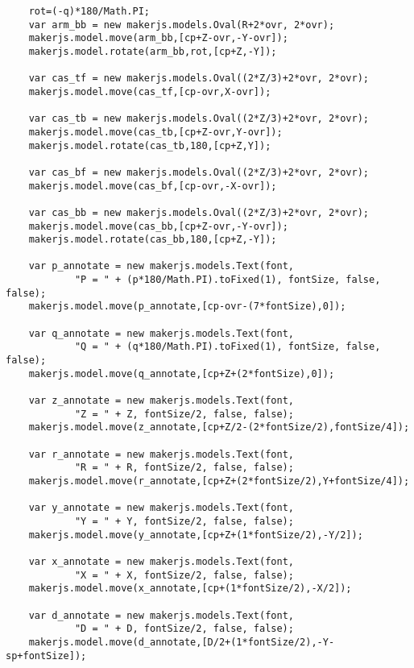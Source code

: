\documentclass[11pt]{article}
\begin{document}
\begin{lstlisting}
    rot=(-q)*180/Math.PI;
    var arm_bb = new makerjs.models.Oval(R+2*ovr, 2*ovr);
    makerjs.model.move(arm_bb,[cp+Z-ovr,-Y-ovr]);
    makerjs.model.rotate(arm_bb,rot,[cp+Z,-Y]);
            
    var cas_tf = new makerjs.models.Oval((2*Z/3)+2*ovr, 2*ovr);
    makerjs.model.move(cas_tf,[cp-ovr,X-ovr]);
                        
    var cas_tb = new makerjs.models.Oval((2*Z/3)+2*ovr, 2*ovr);
    makerjs.model.move(cas_tb,[cp+Z-ovr,Y-ovr]);
    makerjs.model.rotate(cas_tb,180,[cp+Z,Y]);
                            
    var cas_bf = new makerjs.models.Oval((2*Z/3)+2*ovr, 2*ovr);
    makerjs.model.move(cas_bf,[cp-ovr,-X-ovr]);
            
    var cas_bb = new makerjs.models.Oval((2*Z/3)+2*ovr, 2*ovr);
    makerjs.model.move(cas_bb,[cp+Z-ovr,-Y-ovr]);
    makerjs.model.rotate(cas_bb,180,[cp+Z,-Y]);
                                          
    var p_annotate = new makerjs.models.Text(font,
            "P = " + (p*180/Math.PI).toFixed(1), fontSize, false, false);
    makerjs.model.move(p_annotate,[cp-ovr-(7*fontSize),0]);
                      
    var q_annotate = new makerjs.models.Text(font,
            "Q = " + (q*180/Math.PI).toFixed(1), fontSize, false, false);
    makerjs.model.move(q_annotate,[cp+Z+(2*fontSize),0]);
                      
    var z_annotate = new makerjs.models.Text(font,
            "Z = " + Z, fontSize/2, false, false);
    makerjs.model.move(z_annotate,[cp+Z/2-(2*fontSize/2),fontSize/4]);
            
    var r_annotate = new makerjs.models.Text(font,
            "R = " + R, fontSize/2, false, false);
    makerjs.model.move(r_annotate,[cp+Z+(2*fontSize/2),Y+fontSize/4]);
                                   
    var y_annotate = new makerjs.models.Text(font,
            "Y = " + Y, fontSize/2, false, false);
    makerjs.model.move(y_annotate,[cp+Z+(1*fontSize/2),-Y/2]);
                                         
    var x_annotate = new makerjs.models.Text(font,
            "X = " + X, fontSize/2, false, false);
    makerjs.model.move(x_annotate,[cp+(1*fontSize/2),-X/2]);
                                   
    var d_annotate = new makerjs.models.Text(font,
            "D = " + D, fontSize/2, false, false);
    makerjs.model.move(d_annotate,[D/2+(1*fontSize/2),-Y-sp+fontSize]);
            

\end{lstlisting}
\end{document}
